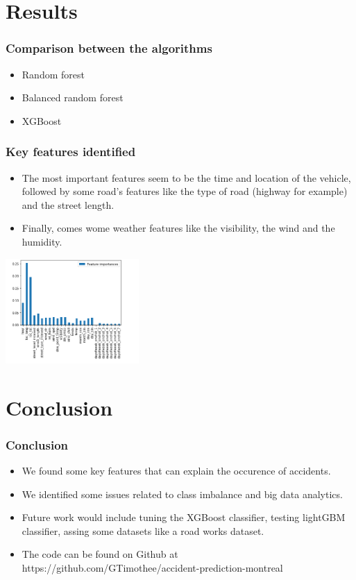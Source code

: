 \documentclass[slidestop,compress,red,mathserif]{beamer}
\begin{document}
\section{Results}

\begin{frame}
	\frametitle{Comparison between the algorithms}
	\begin{itemize}
		\item Random forest
		\item Balanced random forest
		\item XGBoost
	\end{itemize}
\end{frame}

\begin{frame}
	\frametitle{Key features identified}
	\begin{itemize}
		\item The most important features seem to be the time and location of the vehicle, followed by some road's features like the type of road (highway for example) and the street length.
    \item Finally, comes wome weather features like the visibility, the wind and the humidity.
	\end{itemize}
\centering
\includegraphics[height=4cm, keepaspectratio]{Figures/features.png}
\end{frame}

\section{Conclusion}

\begin{frame}
	\frametitle{Conclusion}
	\begin{itemize}
    \item We found some key features that can explain the occurence of accidents.
    \item We identified some issues related to class imbalance and big data analytics.
    \item Future work would include tuning the XGBoost classifier, testing lightGBM classifier, assing some datasets like a road works dataset.
    \item The code can be found on Github at https://github.com/GTimothee/accident-prediction-montreal
	\end{itemize}
\end{frame}
\end{document}
